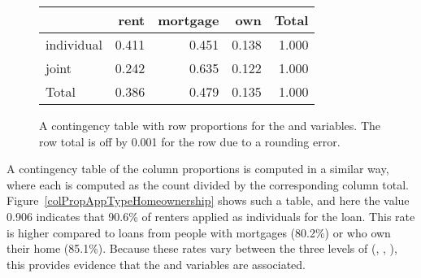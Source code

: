 \begin{figure}
\centering
\begin{tabular}{l rrr r}
  \hline
  & rent & mortgage & own & Total \\
  \hline
  individual & 
      0.411 &
      0.451 &
      0.138 &
      1.000 \\
  joint &
      0.242 &
      0.635 &
      0.122 &
      1.000 \\
  \hline
  Total &
      0.386 &
      0.479 &
      0.135 &
      1.000 \\
  \hline
\end{tabular}
\caption{A contingency table with row proportions
    for the  and
     variables.
    The row total is off by 0.001 for the
     row due to a rounding error.}
\label{rowPropAppTypeHomeownership}
\end{figure}

A contingency table of the column proportions is computed in a similar way, where each  is computed as the count divided by the corresponding column total. Figure~\ref{colPropAppTypeHomeownership} shows such a table, and here the value 0.906 indicates that 90.6\% of renters applied as individuals for the loan. This rate is higher compared to loans from people with mortgages (80.2\%) or who own their home (85.1\%). Because these rates vary between the three levels of  (, , ), this provides evidence that the  and  variables are associated.

